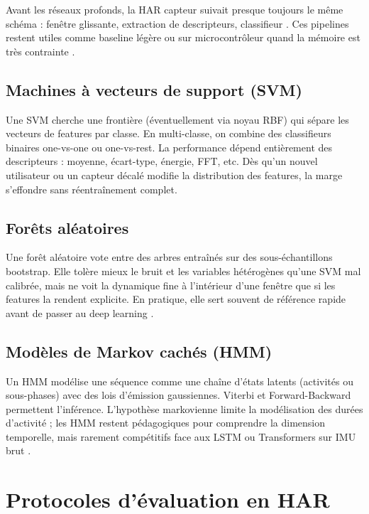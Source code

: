 \documentclass[a4paper,12pt]{report}
\begin{document}
Avant les réseaux profonds, la HAR capteur suivait presque toujours le même
schéma : fenêtre glissante, extraction de descripteurs, classifieur
\parencite{bulling2014}. Ces pipelines restent utiles comme baseline légère ou
sur microcontrôleur quand la mémoire est très contrainte \parencite{wang2019}.

\subsection{Machines à vecteurs de support (SVM)}

Une SVM cherche une frontière (éventuellement via noyau RBF) qui sépare les
vecteurs de features par classe. En multi-classe, on combine des classifieurs
binaires one-vs-one ou one-vs-rest. La performance dépend entièrement des
descripteurs : moyenne, écart-type, énergie, FFT, etc. Dès qu'un nouvel
utilisateur ou un capteur décalé modifie la distribution des features, la marge
s'effondre sans réentraînement complet.

\subsection{Forêts aléatoires}

Une forêt aléatoire vote entre des arbres entraînés sur des sous-échantillons
bootstrap. Elle tolère mieux le bruit et les variables hétérogènes qu'une SVM
mal calibrée, mais ne voit la dynamique fine à l'intérieur d'une fenêtre que si
les features la rendent explicite. En pratique, elle sert souvent de référence
rapide avant de passer au deep learning \parencite{ferrari2020}.

\subsection{Modèles de Markov cachés (HMM)}

Un HMM modélise une séquence comme une chaîne d'états latents (activités ou
sous-phases) avec des lois d'émission gaussiennes. Viterbi et Forward-Backward
permettent l'inférence. L'hypothèse markovienne limite la modélisation des
durées d'activité ; les HMM restent pédagogiques pour comprendre la dimension
temporelle, mais rarement compétitifs face aux LSTM ou Transformers sur IMU
brut \parencite{gu2021}.

\section{Protocoles d'évaluation en HAR}
\end{document}
